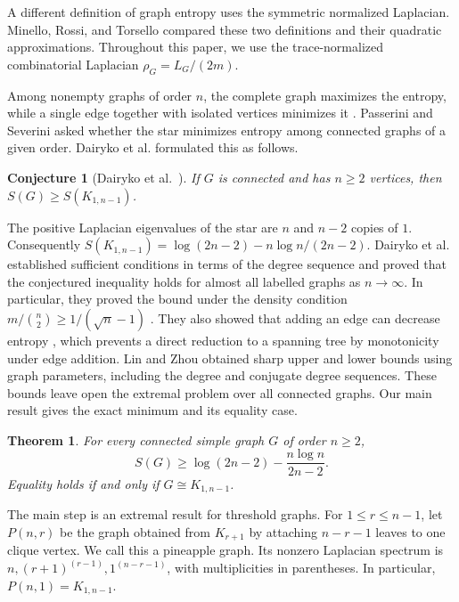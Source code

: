 \documentclass[11pt,a4paper,reqno]{amsart}
\newtheorem{theorem}{Theorem}[section]
\newtheorem{conjecture}{Conjecture}[section]
\theoremstyle{remark}
\newcommand{\Ent}{S}
\newcommand{\Pine}{P}
\numberwithin{equation}{section}
\begin{document}
A different definition of graph entropy uses the symmetric normalized
Laplacian. Minello, Rossi, and Torsello \cite{Minello2019} compared
these two definitions and their quadratic approximations.
Throughout this paper, we use the trace-normalized combinatorial
Laplacian $\rho_G=L_G/(2m)$.

Among nonempty graphs of order $n$, the complete graph maximizes
the entropy, while a single edge together with isolated vertices
minimizes it \cite{Braunstein2006,Dairyko2017}.
Passerini and Severini \cite{Passerini2009} asked whether the star
minimizes entropy among connected graphs of a given order.
Dairyko et al. \cite{Dairyko2017} formulated this as follows.

\begin{conjecture}[Dairyko et al.\ {\cite[Conjecture 1.2]{Dairyko2017}}]\label{conj:star-vonneumann}
If $G$ is connected and has $n\ge2$ vertices, then
$\Ent(G)\ge\Ent(K_{1,n-1})$.
\end{conjecture}

The positive Laplacian eigenvalues of the star are $n$ and $n-2$
copies of $1$. Consequently
$\Ent(K_{1,n-1})=\log(2n-2)-n\log n/(2n-2)$.
Dairyko et al. established sufficient conditions in terms of the
degree sequence and proved that the conjectured inequality holds for
almost all labelled graphs as $n\to\infty$. In particular, they
proved the bound under the density condition
$m/\binom n2\ge1/(\sqrt n-1)$ \cite[Theorem~2.3]{Dairyko2017}.
They also showed that adding an edge can decrease entropy
\cite[Proposition~4.1]{Dairyko2017}, which
prevents a direct reduction to a spanning tree by monotonicity under
edge addition. Lin and Zhou \cite{LinZhou2018} obtained sharp upper
and lower bounds using graph parameters, including the degree and
conjugate degree sequences. These bounds leave open the extremal
problem over all connected graphs. Our main result gives the exact
minimum and its equality case.

\begin{theorem}\label{thm:main}
For every connected simple graph $G$ of order $n\ge2$,
\begin{equation}\label{eq:main}
 \Ent(G)\ge\log(2n-2)-\frac{n\log n}{2n-2}.
\end{equation}
Equality holds if and only if $G\cong K_{1,n-1}$.
\end{theorem}

The main step is an extremal result for threshold graphs.
For $1\le r\le n-1$, let $\Pine(n,r)$ be the graph obtained
from $K_{r+1}$ by attaching $n-r-1$ leaves to one clique vertex.
We call this a pineapple graph. Its nonzero Laplacian spectrum is
$n,(r+1)^{(r-1)},1^{(n-r-1)}$, with multiplicities in parentheses.
In particular, $\Pine(n,1)=K_{1,n-1}$.
\end{document}
